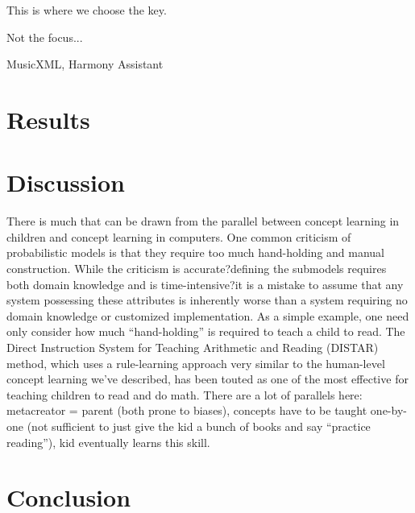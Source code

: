 \documentclass[letterpaper]{article}
\begin{document}
This is where we choose the key.

Not the focus...

MusicXML, Harmony Assistant

\section{Results}

\section{Discussion}

There is much that can be drawn from the parallel between concept learning in children and concept learning in computers. One common criticism of probabilistic models is that they require too much hand-holding and manual construction. While the criticism is accurate?defining the submodels requires both domain knowledge and is time-intensive?it is a mistake to assume that any system possessing these attributes is inherently worse than a system requiring no domain knowledge or customized implementation. As a simple example, one need only consider how much ``hand-holding'' is required to teach a child to read. The Direct Instruction System for Teaching Arithmetic and Reading (DISTAR) method, which uses a rule-learning approach very similar to the human-level concept learning we've described, has been touted as one of the most effective for teaching children to read and do math. There are a lot of parallels here: metacreator = parent (both prone to biases), concepts have to be taught one-by-one (not sufficient to just give the kid a bunch of books and say ``practice reading''), kid eventually learns this skill.

\section{Conclusion}



\end{document}
